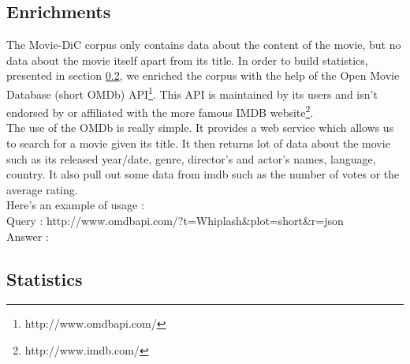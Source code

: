 \subsection{Enrichments}
\label{ssec:enrich}
The Movie-DiC corpus only contains data about the content of the movie, but no data about the movie itself apart from its title. In order to build statistics, presented in section \ref{ssec:stats}, we enriched the corpus with the help of the Open Movie Database (short OMDb) API\footnote{http://www.omdbapi.com/}. This API is maintained by its users and isn't endorsed by or affiliated with the more famous IMDB website\footnote{http://www.imdb.com/}.\\
The use of the OMDb is really simple. It provides a web service which allows us to search for a movie given its title. It then returns lot of data about the movie such as its released year/date, genre, director's and actor's names, language, country. It also pull out some data from imdb such as the number of votes or the average rating.\\
Here's an example of usage :\\
Query : http://www.omdbapi.com/?t=Whiplash\&plot=short\&r=json\\
Answer :

\subsection{Statistics}
\label{ssec:stats}